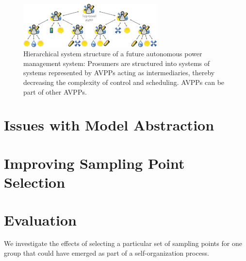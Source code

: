 \documentclass[conference]{IEEEtran}
\begin{document}
\begin{figure}
		\centering
		 \includegraphics[width=0.65\textwidth]{img/avpp-hierarchical-system-structure.pdf}
			\caption{Hierarchical system structure of a future autonomous power management system: Prosumers are structured into systems of systems represented by AVPPs acting as intermediaries, thereby decreasing the complexity of control and scheduling. AVPPs can be part of other AVPPs.}
		\label{fig:avpp-hierarchical-system-structure}
\end{figure}


\section{Issues with Model Abstraction}

\section{Improving Sampling Point Selection}

\section{Evaluation}
We investigate the effects of selecting a particular set of 
sampling points for one group that could have emerged as part
of a self-organization process.





\end{document}
